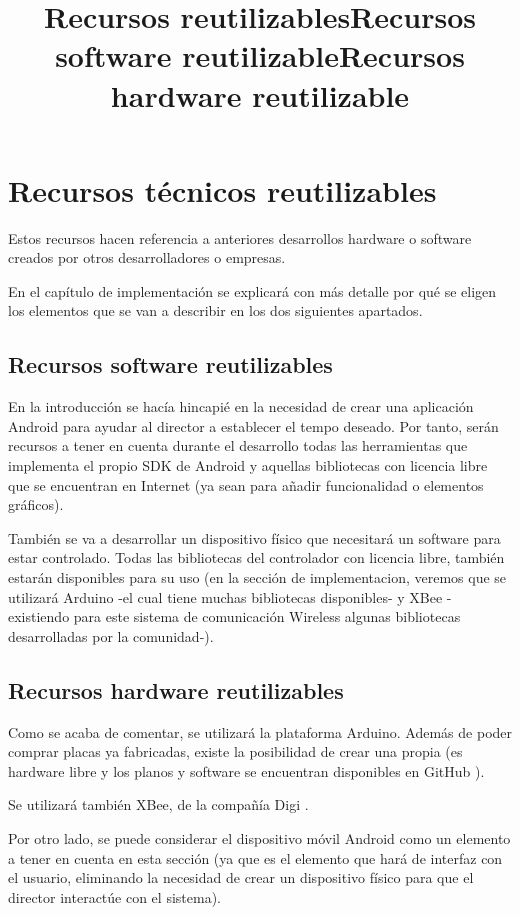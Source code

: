 \title{Recursos reutilizables}
\section{Recursos técnicos reutilizables}

Estos recursos hacen referencia a anteriores desarrollos hardware o software creados
por otros desarrolladores o empresas.

En el capítulo de implementación se explicará con más detalle por qué se
eligen los elementos que se van a describir en los dos siguientes apartados.


\subsection{Recursos software reutilizables}
\title{Recursos software reutilizable}

En la introducción se hacía hincapié en la necesidad de crear una aplicación
Android para ayudar al director a establecer el tempo deseado. Por tanto,
serán recursos a tener en cuenta durante el desarrollo todas las herramientas
que implementa el propio SDK de Android y aquellas bibliotecas con licencia
libre que se encuentran en Internet (ya sean para añadir funcionalidad o elementos
gráficos).


También se va a desarrollar un dispositivo físico que necesitará un software para estar
controlado. Todas las bibliotecas del controlador con licencia libre, también estarán
disponibles para su uso (en la sección de implementacion, veremos que se utilizará
Arduino -el cual tiene muchas bibliotecas disponibles- y XBee -existiendo para este
sistema de comunicación Wireless algunas bibliotecas desarrolladas por la comunidad-).



\subsection{Recursos hardware reutilizables}
\title{Recursos hardware reutilizable}

Como se acaba de comentar, se utilizará la plataforma Arduino. Además de poder comprar
placas ya fabricadas, existe la posibilidad de crear una propia (es hardware libre y
los planos y software se encuentran disponibles en GitHub \cite{arduinoRepo}).


Se utilizará también XBee, de la compañía Digi \cite{xbeedatasheet}.



Por otro lado, se puede considerar el dispositivo móvil Android como un elemento a
tener en cuenta en esta sección (ya que es el elemento que hará de interfaz con el usuario,
eliminando la necesidad de crear un dispositivo físico para que el director interactúe con
el sistema).


